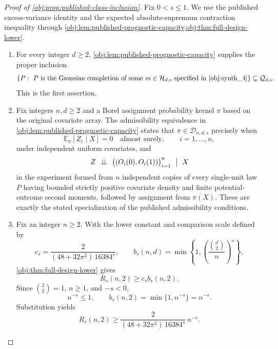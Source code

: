 \begin{proof}[Proof of \cref{obj:prop:published-class-inclusion}]
Fix \(0<s\leq1\). We use the published excess-variance identity
\citep[Proposition 2.3, equation (2.4), under Assumption 2.1 and Definition 2.2]{Cytrynbaum2026Limits}
and the expected absolute-supremum contraction inequality
\citep[Theorem 12(4), with Definition 2]{BartlettMendelson2002Complexities}
through \cref{obj:lem:published-prognostic-capacity,obj:thm:full-design-lower}.

\begin{enumerate}
\item For every integer \(d\geq2\), \cref{obj:lem:published-prognostic-capacity} supplies the proper inclusion
\[
\left\{
P:\ P\text{ is the Gaussian completion of some }
m\in\mathcal H_{d,s}\text{ specified in }\cref{obj:synth_4}
\right\}
\subsetneq\mathcal Q_{d,s}.
\]
This is the first assertion.

\item Fix integers \(n,d\geq2\) and a Borel assignment probability kernel \(\pi\) based on the original covariate array. The admissibility equivalence in
\cref{obj:lem:published-prognostic-capacity} states that
\(\pi\in\mathcal D_{n,d,s}\) precisely when
\[
\mathbb E_\pi[Z_i\mid X]=0
\quad\text{almost surely},\qquad i=1,\ldots,n,
\]
under independent uniform covariates, and
\[
Z\ \perp\!\!\!\perp\
\bigl((O_i(0),O_i(1))\bigr)_{i=1}^n
\ \bigm|\ X
\]
in the experiment formed from \(n\) independent copies of every single-unit law \(P\) having bounded strictly positive covariate density and finite potential-outcome second moments, followed by assignment from \(\pi(X)\). These are exactly the stated specialization of the published admissibility conditions.

\item Fix an integer \(n\geq2\). With the lower constant and comparison scale defined by
\[
c_s=\frac{2}{(48+32\pi^2)\,16384^s},
\qquad
b_s(n,d)=\min\left\{1,\left(\frac{\binom d2}{n}\right)^s\right\},
\]
\cref{obj:thm:full-design-lower} gives
\[
R_s(n,2)\geq c_s b_s(n,2).
\]
Since \(\binom22=1\), \(n\geq1\), and \(-s<0\),
\[
n^{-s}\leq1,
\qquad
b_s(n,2)=\min\{1,n^{-s}\}=n^{-s}.
\]
Substitution yields
\[
R_s(n,2)\geq
\frac{2}{(48+32\pi^2)\,16384^s}\,n^{-s}.
\]


\end{enumerate}
\end{proof}
